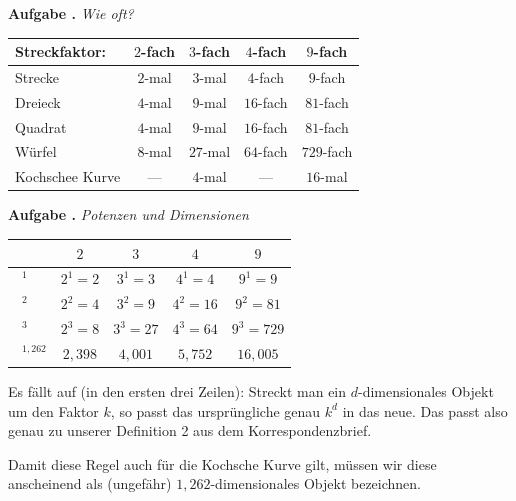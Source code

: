 \documentclass[a4paper,ngerman,12pt]{scrartcl}
\theoremstyle{definition}
\theoremstyle{plain}
\theoremstyle{remark}
\newlength{\aufgabenskip}
\newcounter{aufgabennummer}
\newenvironment{aufgabe}[1]{
  \addtocounter{aufgabennummer}{1}
  \textbf{Aufgabe \theaufgabennummer.} \emph{#1} \par
}{\vspace{\aufgabenskip}}
\begin{document}
\newpage

\begin{aufgabe}{Wie oft?}\label{aufgabe:Wie_oft}
\begin{center}
	\renewcommand{\arraystretch}{2}
	\begin{tabular}{l||c|c|c|c}
		Streckfaktor:& $2$-fach & $3$-fach & $4$-fach & $9$-fach \\\hline\hline
		Strecke      & $2$-mal	& $3$-mal  & $4$-fach & $9$-fach \\\hline
		Dreieck      & $4$-mal  & $9$-mal  & $16$-fach & $81$-fach \\\hline
		Quadrat      & $4$-mal  & $9$-mal  & $16$-fach & $81$-fach  \\\hline
		Würfel       & $8$-mal  & $27$-mal  & $64$-fach & $729$-fach  \\\hline
		Kochschee Kurve & ---   & $4$-mal  & ---      & $16$-mal  \\      	
	\end{tabular}
\end{center}
\end{aufgabe}

\begin{aufgabe}{Potenzen und Dimensionen}
\begin{center}
	\renewcommand{\arraystretch}{2}
	\begin{tabular}{l||c|c|c|c}
				      & $2$ & $3$ & $4$ & $9$ \\\hline\hline
		$\boxed{\phantom{1}}^1$  & $2^1=2$	& $3^1=3$ & $4^1=4$  & $9^1=9$ \\\hline
		$\boxed{\phantom{1}}^2$  & $2^2=4$	& $3^2=9$ & $4^2=16$ & $9^2=81$\\\hline
		$\boxed{\phantom{1}}^3$  & $2^3=8$	& $3^3=27$ & $4^3=64$ & $9^3=729$ \\\hline
		$\boxed{\phantom{1}}^{1,262}$  & $2,398$ & $4,001$ & $5,752$ & $16,005$     	
	\end{tabular}
\end{center}

Es fällt auf (in den ersten drei Zeilen): Streckt man ein $d$-dimensionales Objekt um den Faktor $k$, so passt das ursprüngliche genau $k^d$ in das neue. Das passt also genau zu unserer Definition 2 aus dem Korrespondenzbrief.

Damit diese Regel auch für die Kochsche Kurve gilt, müssen wir diese anscheinend als (ungefähr) $1,262$-dimensionales Objekt bezeichnen.

\end{aufgabe}
\end{document}
